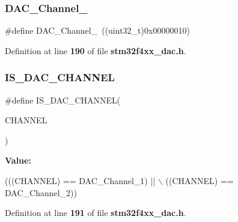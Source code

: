\subsubsection{D\+A\+C\+\_\+\+Channel\+\_}
{\footnotesize\ttfamily \#define D\+A\+C\+\_\+\+Channel\+\_~((uint32\+\_\+t)0x00000010)}



Definition at line \textbf{ 190} of file \textbf{ stm32f4xx\+\_\+dac.\+h}.

\mbox{\label{group__DAC__Channel__selection_gafb2b9bdaccb3a5e3396925d7cba02cc3}} 
\subsubsection{I\+S\+\_\+\+D\+A\+C\+\_\+\+C\+H\+A\+N\+N\+EL}
{\footnotesize\ttfamily \#define I\+S\+\_\+\+D\+A\+C\+\_\+\+C\+H\+A\+N\+N\+EL(\begin{DoxyParamCaption}\item[{}]{C\+H\+A\+N\+N\+EL }\end{DoxyParamCaption})}

{\bfseries Value\+:}
\begin{DoxyCode}
(((CHANNEL) == DAC_Channel_1) || \(\backslash\)
                                 ((CHANNEL) == DAC_Channel_2))
\end{DoxyCode}


Definition at line \textbf{ 191} of file \textbf{ stm32f4xx\+\_\+dac.\+h}.

